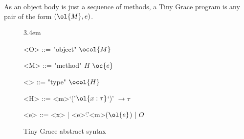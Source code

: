 As an object body is just a sequence of methods, a Tiny Grace program is any
pair of the form $(\ol{M},e)$.

\begin{figure}
  \centering

  \grammarindent3.4em
  \renewcommand{\grammarlabel}[2]{$#1$\hfill#2}
  \renewcommand{\syntleft}{\itshape}
  \renewcommand{\syntright}{}
  \renewcommand{\ulitleft}{\sffamily\bfseries}
  \renewcommand{\litleft}{\sffamily}
  \renewcommand{\litright}{}

  \vspace{1em}
  \begin{minipage}{10.3em}
    \begin{grammar}
      <O> ::= "object" \!$\ocol{M}$

      <M> ::= "method" $H$ $\oc{e}$

      <\tau> ::= "type" \!$\ocol{H}$

      <H> ::= <m>`('$\ol{x:\tau}$`)' $\to\tau$

      <e> ::= <x> | <e>`.'<m>($\ol{e}$) | $O$
    \end{grammar}
  \end{minipage}

  \caption{Tiny Grace abstract syntax}\label{fig:abstract-syntax}
\end{figure}

